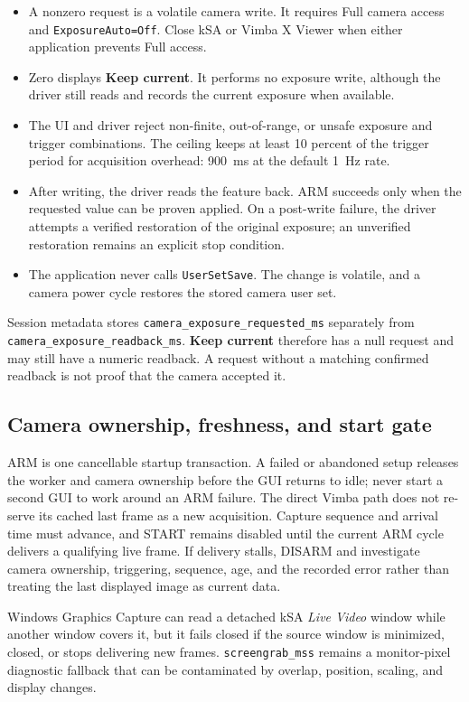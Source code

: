 \documentclass[10pt,a4paper]{article}
\begin{document}
\begin{itemize}[itemsep=1.2pt,topsep=1pt]
  \item A nonzero request is a volatile camera write. It requires Full camera access and \texttt{ExposureAuto=Off}. Close kSA or Vimba X Viewer when either application prevents Full access.
  \item Zero displays \textbf{Keep current}. It performs no exposure write, although the driver still reads and records the current exposure when available.
  \item The UI and driver reject non-finite, out-of-range, or unsafe exposure and trigger combinations. The ceiling keeps at least 10 percent of the trigger period for acquisition overhead: 900~ms at the default 1~Hz rate.
  \item After writing, the driver reads the feature back. ARM succeeds only when the requested value can be proven applied. On a post-write failure, the driver attempts a verified restoration of the original exposure; an unverified restoration remains an explicit stop condition.
  \item The application never calls \texttt{UserSetSave}. The change is volatile, and a camera power cycle restores the stored camera user set.
\end{itemize}

Session metadata stores \texttt{camera\_exposure\_requested\_ms} separately from \texttt{camera\_exposure\_readback\_ms}. \textbf{Keep current} therefore has a null request and may still have a numeric readback. A request without a matching confirmed readback is not proof that the camera accepted it.

\subsection{Camera ownership, freshness, and start gate}
ARM is one cancellable startup transaction. A failed or abandoned setup releases the worker and camera ownership before the GUI returns to idle; never start a second GUI to work around an ARM failure. The direct Vimba path does not re-serve its cached last frame as a new acquisition. Capture sequence and arrival time must advance, and START remains disabled until the current ARM cycle delivers a qualifying live frame. If delivery stalls, DISARM and investigate camera ownership, triggering, sequence, age, and the recorded error rather than treating the last displayed image as current data.

Windows Graphics Capture can read a detached kSA \textit{Live Video} window while another window covers it, but it fails closed if the source window is minimized, closed, or stops delivering new frames. \texttt{screengrab\_mss} remains a monitor-pixel diagnostic fallback that can be contaminated by overlap, position, scaling, and display changes.
\end{document}
